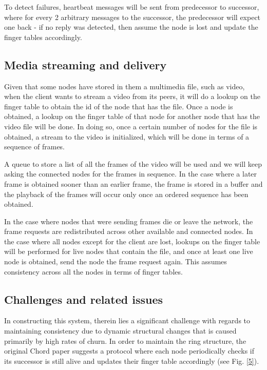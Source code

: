 \documentclass[fleqn,24pt]{SelfArx} %
\begin{document}
To detect failures, heartbeat messages will be sent from predecessor to successor, where for every 2 arbitrary messages to the successor, the predecessor will expect one back - if no reply was detected, then assume the node is lost and update the finger tables accordingly.

\subsection{Media streaming and delivery}

Given that some nodes have stored in them a multimedia file, such as video, when the client wants to stream a video from its peers, it will do a lookup on the finger table to obtain the id of the node that has the file. Once a node is obtained, a lookup on the finger table of that node for another node that has the video file will be done. In doing so, once a certain number of nodes for the file is obtained, a stream to the video is initialized, which will be done in terms of a sequence of frames. 

A queue to store a list of all the frames of the video will be used and we will keep asking the connected nodes for the frames in sequence. In the case where a later frame is obtained sooner than an earlier frame, the frame is stored in a buffer and the playback of the frames will occur only once an ordered sequence has been obtained. 

In the case where nodes that were sending frames die or leave the network, the frame requests are redistributed across other available and connected nodes. In the case where all nodes except for the client are lost, lookups on the finger table will be performed for live nodes that contain the file, and once at least one live node is obtained, send the node the frame request again. This assumes consistency across all the nodes in terms of finger tables.

\subsection{Challenges and related issues}

In constructing this system, therein lies a significant challenge with regards to maintaining consistency due to dynamic structural changes that is caused primarily by high rates of churn. In order to maintain the ring structure, the original Chord paper \cite{2} suggests a protocol where each node periodically checks if its successor is still alive and updates their finger table accordingly (see Fig. \ref{5}).
\end{document}
